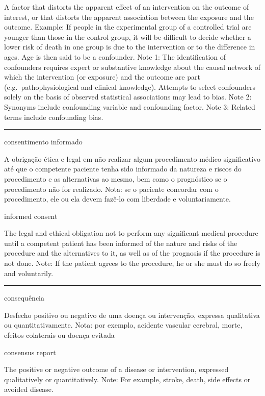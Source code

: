 \documentclass[
  openany]{book}
\begin{document}
A factor that distorts the apparent effect of an intervention on the outcome of interest, or that distorts the apparent association between the exposure and the outcome. Example: If people in the experimental group of a controlled trial are younger than those in the control group, it will be difficult to decide whether a lower risk of death in one group is due to the intervention or to the difference in ages. Age is then said to be a confounder. Note 1: The identification of confounders requires expert or substantive knowledge about the causal network of which the intervention (or exposure) and the outcome are part (e.g.~pathophysiological and clinical knowledge). Attempts to select confounders solely on the basis of observed statistical associations may lead to bias. Note 2: Synonyms include confounding variable and confounding factor. Note 3: Related terms include confounding bias.

\begin{center}\rule{0.5\linewidth}{0.5pt}\end{center}

consentimento informado

A obrigação ética e legal em não realizar algum procedimento médico significativo até que o competente paciente tenha sido informado da natureza e riscos do procedimento e as alternativas ao mesmo, bem como o prognóstico se o procedimento não for realizado. Nota: se o paciente concordar com o procedimento, ele ou ela devem fazê-lo com liberdade e voluntariamente.

informed consent

The legal and ethical obligation not to perform any significant medical procedure until a competent patient has been informed of the nature and risks of the procedure and the alternatives to it, as well as of the prognosis if the procedure is not done. Note: If the patient agrees to the procedure, he or she must do so freely and voluntarily.

\begin{center}\rule{0.5\linewidth}{0.5pt}\end{center}

consequência

Desfecho positivo ou negativo de uma doença ou intervenção, expressa qualitativa ou quantitativamente. Nota: por exemplo, acidente vascular cerebral, morte, efeitos colaterais ou doença evitada

consensus report

The positive or negative outcome of a disease or intervention, expressed qualitatively or quantitatively. Note: For example, stroke, death, side effects or avoided disease.
\end{document}
